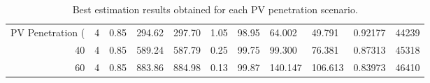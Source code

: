\begin{table}
\caption{Best estimation results obtained for each PV penetration scenario.}
\label{tab:best_results}
\begin{tabular}{rrllllllllr}
\toprule
PV Penetration (%
\midrule
20 & 4 & 0.85 & 294.62 & 297.70 & 1.05 & 98.95 & 64.002 & 49.791 & 0.92177 & 44239 \\
40 & 4 & 0.85 & 589.24 & 587.79 & 0.25 & 99.75 & 99.300 & 76.381 & 0.87313 & 45318 \\
60 & 4 & 0.85 & 883.86 & 884.98 & 0.13 & 99.87 & 140.147 & 106.613 & 0.83973 & 46410 \\
\bottomrule
\end{tabular}
\end{table}
